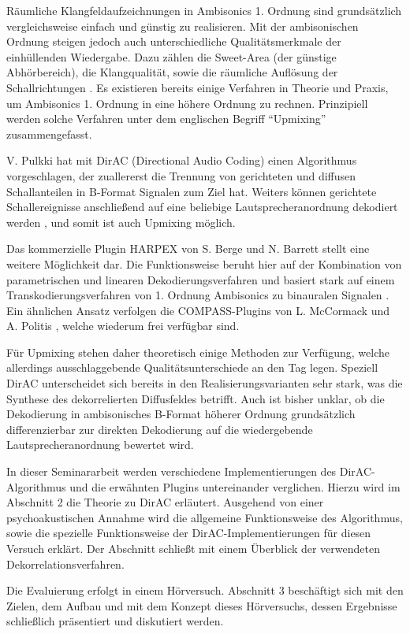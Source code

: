 Räumliche Klangfeldaufzeichnungen in Ambisonics 1. Ordnung sind grundsätzlich vergleichsweise einfach und günstig zu realisieren. Mit der ambisonischen Ordnung steigen jedoch auch unterschiedliche Qualitätsmerkmale der einhüllenden Wiedergabe. Dazu zählen die Sweet-Area (der günstige Abhörbereich), die Klangqualität, sowie die räumliche Auflösung der Schallrichtungen \cite{ambi-book}. Es existieren bereits einige Verfahren in Theorie und Praxis, um Ambisonics 1. Ordnung in eine höhere Ordnung zu rechnen. Prinzipiell werden solche Verfahren unter dem englischen Begriff ``Upmixing'' zusammengefasst.

V. Pulkki hat mit DirAC (Directional Audio Coding) \cite{pulkki} einen Algorithmus vorgeschlagen, der zuallererst die Trennung von gerichteten und diffusen Schallanteilen in B-Format Signalen zum Ziel hat. Weiters können gerichtete Schallereignisse anschließend auf eine beliebige Lautsprecheranordnung dekodiert werden \cite{spatial-book}, und somit ist auch Upmixing möglich.

Das kommerzielle Plugin HARPEX von S. Berge und N. Barrett stellt eine weitere Möglichkeit dar. Die Funktionsweise beruht hier auf der Kombination von parametrischen und linearen Dekodierungsverfahren \cite{harpy2} und basiert stark auf einem Transkodierungsverfahren von 1. Ordnung Ambisonics zu binauralen Signalen \cite{harpy}. Ein ähnlichen Ansatz verfolgen die COMPASS-Plugins von L. McCormack und A. Politis \cite{compy}, welche wiederum frei verfügbar sind.

Für Upmixing stehen daher theoretisch einige Methoden zur Verfügung, welche allerdings ausschlaggebende Qualitätsunterschiede an den Tag legen. Speziell DirAC unterscheidet sich bereits in den Realisierungsvarianten sehr stark, was die Synthese des dekorrelierten Diffusfeldes betrifft. Auch ist bisher unklar, ob die Dekodierung in ambisonisches B-Format höherer Ordnung grundsätzlich differenzierbar zur direkten Dekodierung auf die wiedergebende Lautsprecheranordnung bewertet wird.

In dieser Seminararbeit werden verschiedene Implementierungen des DirAC-Algorithmus und die erwähnten Plugins untereinander verglichen. Hierzu wird im Abschnitt 2 die Theorie zu DirAC erläutert. Ausgehend von einer psychoakustischen Annahme wird die allgemeine Funktionsweise des Algorithmus, sowie die spezielle Funktionsweise der DirAC-Implementierungen für diesen Versuch erklärt. Der Abschnitt schließt mit einem Überblick der verwendeten Dekorrelationsverfahren.

Die Evaluierung erfolgt in einem Hörversuch. Abschnitt 3 beschäftigt sich mit den Zielen, dem Aufbau und mit dem Konzept dieses Hörversuchs, dessen Ergebnisse schließlich präsentiert und diskutiert werden.